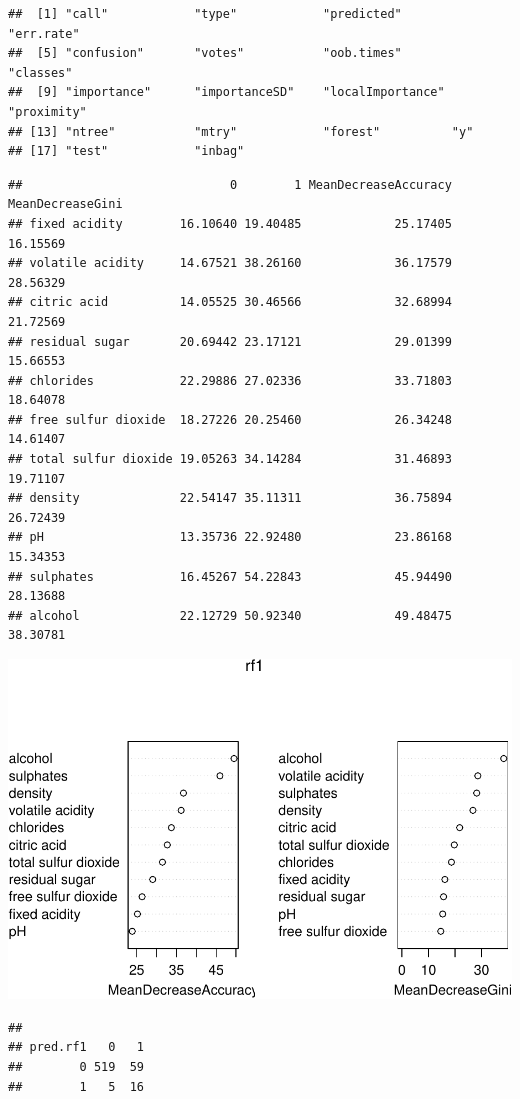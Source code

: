 \documentclass[
  english,
  man]{apa6}
\begin{document}
\begin{verbatim}
##  [1] "call"            "type"            "predicted"       "err.rate"       
##  [5] "confusion"       "votes"           "oob.times"       "classes"        
##  [9] "importance"      "importanceSD"    "localImportance" "proximity"      
## [13] "ntree"           "mtry"            "forest"          "y"              
## [17] "test"            "inbag"
\end{verbatim}

\begin{verbatim}
##                             0        1 MeanDecreaseAccuracy MeanDecreaseGini
## fixed acidity        16.10640 19.40485             25.17405         16.15569
## volatile acidity     14.67521 38.26160             36.17579         28.56329
## citric acid          14.05525 30.46566             32.68994         21.72569
## residual sugar       20.69442 23.17121             29.01399         15.66553
## chlorides            22.29886 27.02336             33.71803         18.64078
## free sulfur dioxide  18.27226 20.25460             26.34248         14.61407
## total sulfur dioxide 19.05263 34.14284             31.46893         19.71107
## density              22.54147 35.11311             36.75894         26.72439
## pH                   13.35736 22.92480             23.86168         15.34353
## sulphates            16.45267 54.22843             45.94490         28.13688
## alcohol              22.12729 50.92340             49.48475         38.30781
\end{verbatim}

\includegraphics{report_files/figure-latex/unnamed-chunk-8-1.pdf}

\begin{verbatim}
##         
## pred.rf1   0   1
##        0 519  59
##        1   5  16
\end{verbatim}
\end{document}
